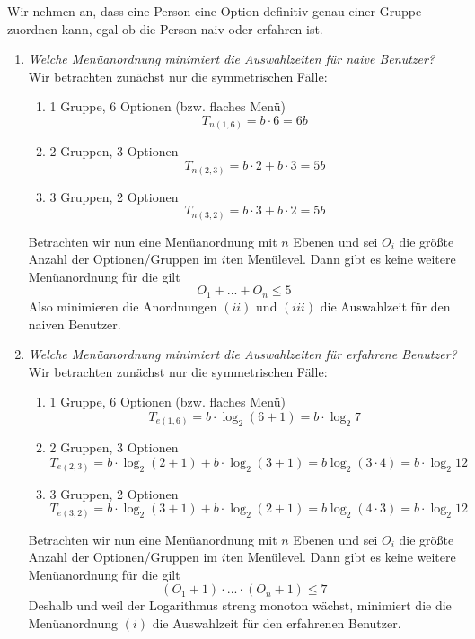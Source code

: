 \documentclass[a4paper,10pt]{article}
\begin{document}
\kopf
\renewcommand{\figurename}{Figure}

Wir nehmen an, dass eine Person eine Option definitiv genau einer Gruppe zuordnen kann, egal ob die Person naiv oder erfahren ist.
\begin{enumerate}
	\item \textit{Welche Menüanordnung minimiert die Auswahlzeiten für naive Benutzer?}\\
		Wir betrachten zunächst nur die symmetrischen Fälle:
		\begin{enumerate}
			\item 1 Gruppe, 6 Optionen (bzw. flaches Menü)
			\[T_{n(1,6)} = b \cdot 6 = 6b\]
			\item 2 Gruppen, 3 Optionen
			\[T_{n(2,3)} = b \cdot 2 + b \cdot 3 = 5b\]
			\item 3 Gruppen, 2 Optionen
			\[T_{n(3,2)} = b \cdot 3 + b \cdot 2 = 5b\]
		\end{enumerate}
		
		Betrachten wir nun eine Menüanordnung mit $n$ Ebenen und sei $O_i$ die größte Anzahl der Optionen/Gruppen im $i$ten Menülevel.
		Dann gibt es keine weitere Menüanordnung für die gilt \[O_1 + ... + O_n \leq 5\]
		Also minimieren die Anordnungen \( (ii) \) und \( (iii) \) die Auswahlzeit für den naiven Benutzer.
	\item \textit{Welche Menüanordnung minimiert die Auswahlzeiten für erfahrene Benutzer?}\\
		Wir betrachten zunächst nur die symmetrischen Fälle:
		\begin{enumerate}
			\item 1 Gruppe, 6 Optionen (bzw. flaches Menü)
			\[T_{e(1,6)} = b \cdot \log_2{(6+1)} = b \cdot \log_2{7}\]
			\item 2 Gruppen, 3 Optionen
			\[T_{e(2,3)} = b \cdot \log_2{(2+1)} + b \cdot \log_2{(3+1)} = b \log_2{(3\cdot4)} = b \cdot \log_2{12}\]
			\item 3 Gruppen, 2 Optionen
			\[T_{e(3,2)} = b \cdot \log_2{(3+1)} + b \cdot \log_2{(2+1)} = b \log_2{(4\cdot3)} = b \cdot \log_2{12}\]
		\end{enumerate}
		Betrachten wir nun eine Menüanordnung mit $n$ Ebenen und sei $O_i$ die größte Anzahl der Optionen/Gruppen im $i$ten Menülevel.
		Dann gibt es keine weitere Menüanordnung für die gilt \[(O_1+1) \cdot ... \cdot (O_n + 1) \leq 7\]
		Deshalb und weil der Logarithmus streng monoton wächst, minimiert die die Menüanordnung \( (i) \) die Auswahlzeit für den erfahrenen Benutzer. 
\end{enumerate}
\end{document}
